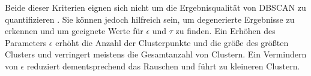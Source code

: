\documentclass[utf8,biblatex]{lni}
\begin{document}
Beide dieser Kriterien eignen sich nicht um die Ergebnisqualität von DBSCAN zu quantifizieren \cite{TODS4203-19}.
Sie können jedoch hilfreich sein,
um degenerierte Ergebnisse zu erkennen und um geeignete Werte für $\epsilon$ und $\tau$
zu finden.
Ein Erhöhen des Parameters $\epsilon$ erhöht die Anzahl der Clusterpunkte und die größe des größten Clusters und
verringert meistens die Gesamtanzahl von Clustern. Ein Vermindern von $\epsilon$ reduziert dementsprechend das Rauschen
und führt zu kleineren Clustern.

\printbibliography
\end{document}
